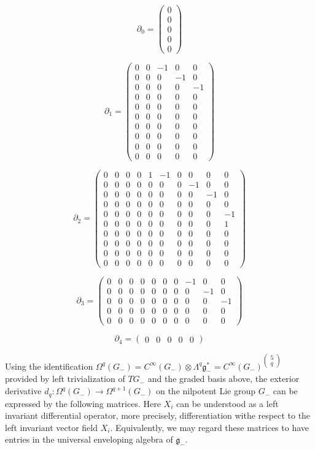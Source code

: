 \documentclass[reqno,12pt]{amsart}
\newcommand\goe{\mathfrak g}
\theoremstyle{plain}
\theoremstyle{definition}
\begin{document}
$$
\partial_0=\left(\begin{array}{c}
0\\0\\\hline0\\\hline0\\0
\end{array}\right)
$$

$$
\partial_1=\left(\begin{array}{cc|c|cc}
0&0&-1&0&0\\
\hline
0&0&0&-1&0\\
0&0&0&0&-1\\
\hline
0&0&0&0&0\\
0&0&0&0&0\\
0&0&0&0&0\\
0&0&0&0&0\\
\hline
0&0&0&0&0\\
0&0&0&0&0\\
\hline
0&0&0&0&0
\end{array}\right)
$$

$$
\partial_2=\left(\begin{array}{c|cc|cccc|cc|c}
0&0&0&0&1&-1&0&0&0&0\\
\hline
0&0&0&0&0&0&0&-1&0&0\\
0&0&0&0&0&0&0&0&-1&0\\
\hline
0&0&0&0&0&0&0&0&0&0\\
0&0&0&0&0&0&0&0&0&-1\\
0&0&0&0&0&0&0&0&0&1\\
0&0&0&0&0&0&0&0&0&0\\
\hline
0&0&0&0&0&0&0&0&0&0\\
0&0&0&0&0&0&0&0&0&0\\
\hline
0&0&0&0&0&0&0&0&0&0
\end{array}\right)
$$

$$
\partial_3=\left(\begin{array}{c|cc|cccc|cc|c}
0&0&0&0&0&0&0&-1&0&0\\
0&0&0&0&0&0&0&0&-1&0\\
\hline
0&0&0&0&0&0&0&0&0&-1\\
\hline
0&0&0&0&0&0&0&0&0&0\\
0&0&0&0&0&0&0&0&0&0
\end{array}\right)
$$

$$
\partial_4=\left(\begin{array}{cc|c|cc}
0&0&0&0&0
\end{array}\right)
$$

Using the identification $\Omega^q(G_-)=C^\infty(G_-)\otimes\Lambda^q\goe^*_-=C^\infty(G_-)^{\left(\substack{5\\q}\right)}$ provided by left trivialization of $TG_-$ and the graded basis above, the exterior derivative $d_q\colon\Omega^q(G_-)\to\Omega^{q+1}(G_-)$ on the nilpotent Lie group $G_-$ can be expressed by the following matrices.
Here $X_i$ can be understood as a left invariant differential operator, more precisely, differentiation withe respect to the left invariant vector field $X_i$.
Equivalently, we may regard these matrices to have entries in the universal enveloping algebra of $\goe_-$.
\end{document}
